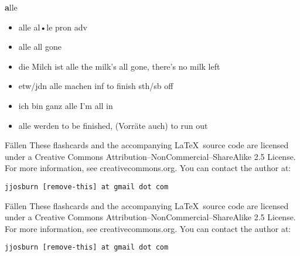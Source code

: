 \documentclass[avery5371,grid]{flashcards}
\begin{document}

\begin{flashcard}[Verb]{\selectfont\Huge\textbf alle}
{\selectfont\textbf\tiny \begin{itemize} 
 \setlength\itemsep{-0.5em}
\item alle al•le pron adv  
\item alle all gone  
\item die Milch ist alle  the milk's all gone, there's no milk left  
\item etw/jdn alle machen inf   to finish sth/sb off  
\item ich bin ganz alle I'm all in  
\item alle werden to be finished, (Vorräte auch) to run out  
\end{itemize} }

\end{flashcard}

\begin{flashcard}[Verb]{\Huge Fällen}
{\large These flashcards and the accompanying \LaTeX \, source code are licensed
under a Creative Commons Attribution--NonCommercial--ShareAlike 2.5 License.  
For more information, see creativecommons.org.  You can contact the author at: }
\begin{center}
\begin{small}\tt jjosburn [remove-this] at gmail dot com\end{small}
\end{center}
\end{flashcard}

\begin{flashcard}[Verb]{\Huge Fällen}
{\large These flashcards and the accompanying \LaTeX \, source code are licensed
under a Creative Commons Attribution--NonCommercial--ShareAlike 2.5 License.  
For more information, see creativecommons.org.  You can contact the author at: }
\begin{center}
\begin{small}\tt jjosburn [remove-this] at gmail dot com\end{small}
\end{center}
\end{flashcard}
\end{document}
